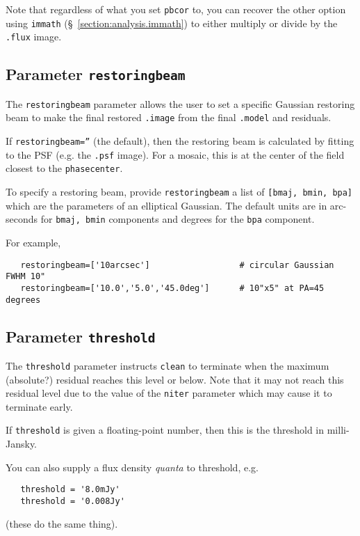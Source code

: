 Note that regardless of what you set {\tt pbcor} to, you can recover
the other option using {\tt immath} (\S~\ref{section:analysis.immath})
to either multiply or divide by the {\tt .flux} image.

\subsection{Parameter {\tt restoringbeam} }
\label{section:im.clean.restoringbeam}

The {\tt restoringbeam} parameter allows the user to set a specific
Gaussian restoring beam to make the final restored {\tt .image} from
the final {\tt .model} and residuals.

If {\tt restoringbeam=''} (the default), then the restoring beam
is calculated by fitting to the PSF (e.g. the {\tt .psf} image).
For a mosaic, this is at the center of the field closest to the
{\tt phasecenter}.

To specify a restoring beam, provide {\tt restoringbeam} a list of 
{\tt [bmaj, bmin, bpa]} which are the parameters of an elliptical
Gaussian.  The default units are in arc-seconds for {\tt bmaj, bmin}
components and degrees for the {\tt bpa} component.

For example,
\small
\begin{verbatim}
   restoringbeam=['10arcsec']                  # circular Gaussian FWHM 10"
   restoringbeam=['10.0','5.0','45.0deg']      # 10"x5" at PA=45 degrees
\end{verbatim}
\normalsize

\subsection{Parameter {\tt threshold} }
\label{section:im.clean.thresh}

The {\tt threshold} parameter instructs {\tt clean} to terminate when
the maximum (absolute?) residual reaches this level or below.  Note
that it may not reach this residual level due to the value of the
{\tt niter} parameter which may cause it to terminate early.

If {\tt threshold} is given a floating-point number, then this is the
threshold in milli-Jansky.

You can also supply a flux density {\em quanta} to threshold, e.g.
\small
\begin{verbatim}
   threshold = '8.0mJy'
   threshold = '0.008Jy'
\end{verbatim}
\normalsize
(these do the same thing).

